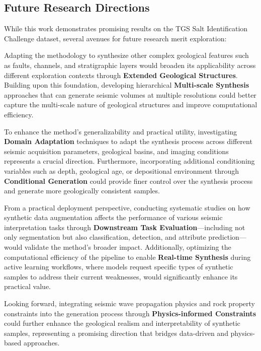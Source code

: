 \documentclass{ieeeaccess}
\begin{document}
\subsection{Future Research Directions}

While this work demonstrates promising results on the TGS Salt Identification Challenge dataset, several avenues for future research merit exploration:

Adapting the methodology to synthesize other complex geological features such as faults, channels, and stratigraphic layers would broaden its applicability across different exploration contexts through \textbf{Extended Geological Structures}. Building upon this foundation, developing hierarchical \textbf{Multi-scale Synthesis} approaches that can generate seismic volumes at multiple resolutions could better capture the multi-scale nature of geological structures and improve computational efficiency.

To enhance the method's generalizability and practical utility, investigating \textbf{Domain Adaptation} techniques to adapt the synthesis process across different seismic acquisition parameters, geological basins, and imaging conditions represents a crucial direction. Furthermore, incorporating additional conditioning variables such as depth, geological age, or depositional environment through \textbf{Conditional Generation} could provide finer control over the synthesis process and generate more geologically consistent samples.

From a practical deployment perspective, conducting systematic studies on how synthetic data augmentation affects the performance of various seismic interpretation tasks through \textbf{Downstream Task Evaluation}—including not only segmentation but also classification, detection, and attribute prediction—would validate the method's broader impact. Additionally, optimizing the computational efficiency of the pipeline to enable \textbf{Real-time Synthesis} during active learning workflows, where models request specific types of synthetic samples to address their current weaknesses, would significantly enhance its practical value.

Looking forward, integrating seismic wave propagation physics and rock property constraints into the generation process through \textbf{Physics-informed Constraints} could further enhance the geological realism and interpretability of synthetic samples, representing a promising direction that bridges data-driven and physics-based approaches.
\end{document}
